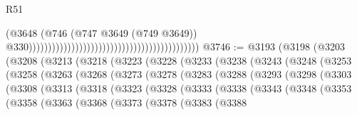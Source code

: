 \begin{lexlean}{R51}
\begin{coremodule}
                                                                                        (@3648
                                                                                          (@746
                                                                                            (@747
                                                                                              @3649
                                                                                              (@749
                                                                                                @3649))
                                                                                            @330))))))))))))))))))))))))))))))))))))))))))))
@3746 := @3193
    (@3198
      (@3203
        (@3208
          (@3213
            (@3218
              (@3223
                (@3228
                  (@3233
                    (@3238
                      (@3243
                        (@3248
                          (@3253
                            (@3258
                              (@3263
                                (@3268
                                  (@3273
                                    (@3278
                                      (@3283
                                        (@3288
                                          (@3293
                                            (@3298
                                              (@3303
                                                (@3308
                                                  (@3313
                                                    (@3318
                                                      (@3323
                                                        (@3328
                                                          (@3333
                                                            (@3338
                                                              (@3343
                                                                (@3348
                                                                  (@3353
                                                                    (@3358
                                                                      (@3363
                                                                        (@3368
                                                                          (@3373
                                                                            (@3378
                                                                              (@3383
                                                                                (@3388

\end{coremodule}
\end{lexlean}
